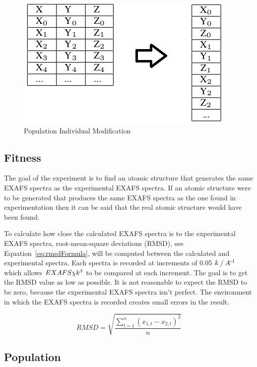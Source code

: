 \documentclass[conference]{IEEEtran}
\begin{document}
\begin{figure}
  \begin{center}
    \includegraphics[bb=0 0 400 241,scale=0.5]{refs/ThisBecomesThat.png}
  \end{center}
  \caption{Population Individual Modification}
  \label{fig:postOpExplain}
\end{figure}

\subsection{Fitness}

The goal of the experiment is to find an atomic structure that generates the same EXAFS spectra as the experimental EXAFS spectra. If an atomic structure were to be generated that produces the same EXAFS spectra as the one found in experimentation then it can be said that the real atomic structure would have been found.

To calculate how close the calculated EXAFS spectra is to the experimental EXAFS spectra, root-mean-square deviations (RMSD), see Equation~\ref{eq:rmsdFormula}, will be computed between the calculated and experimental spectra. Each spectra is recorded at increments of 0.05 $k \mathbin{/} A\textsuperscript{-1}$ which allows $EXAFS \chi k\textsuperscript{3}$ to be compared at each increment. The goal is to get the RMSD value as low as possible. It is not reasonable to expect the RMSD to be zero, because the experimental EXAFS spectra isn't perfect. The environment in which the EXAFS spectra is recorded creates small errors in the result.

\begin{equation}
  \label{eq:rmsdFormula}
  RMSD = \sqrt{\frac{\sum_{t=1}^{n} \left ( x_{1,t}-x_{2,t} \right )^{2}}{n}}
\end{equation}

\subsection{Population}
\label{sec:population}
\end{document}
